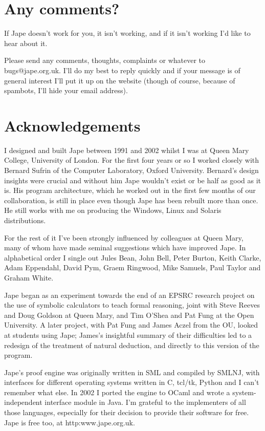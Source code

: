 \documentclass[11pt]{book}
\begin{document}
\section*{Any comments?}

If Jape doesn't work for you, it isn't working, and if it isn't working I'd like to hear about it. 

Please send any comments, thoughts, complaints or whatever to bugs@jape.org.uk. I'll do my best to reply quickly and if your message is of general interest I'll put it up on the website (though of course, because of spambots, I'll hide your email address). 

\section*{Acknowledgements}

I designed and built Jape between 1991 and 2002 whilst I was at Queen Mary College, University of London. For the first four years or so I worked closely with Bernard Sufrin of the Computer Laboratory, Oxford University. Bernard's design insights were crucial and without him Jape wouldn't exist or be half as good as it is. His program architecture, which he worked out in the first few months of our collaboration, is still in place even though Jape has been rebuilt more than once. He still works with me on producing the Windows, Linux and Solaris distributions.

For the rest of it I've been strongly influenced by colleagues at Queen Mary, many of whom have made seminal suggestions which have improved Jape. In alphabetical order I single out Jules Bean, John Bell, Peter Burton, Keith Clarke, Adam Eppendahl, David Pym, Graem Ringwood, Mike Samuels, Paul Taylor and Graham White. 

Jape began as an experiment towards the end of an EPSRC research project on the use of symbolic calculators to teach formal reasoning, joint with Steve Reeves and Doug Goldson at Queen Mary, and Tim O'Shea and Pat Fung at the Open University. A later project, with Pat Fung and James Aczel from the OU, looked at students using Jape; James's insightful summary of their difficulties led to a redesign of the treatment of natural deduction, and directly to this version of the program.

Jape's proof engine was originally written in SML and compiled by SMLNJ, with interfaces for different operating systems written in C, tcl/tk, Python and I can't remember what else. In 2002 I ported the engine to OCaml and wrote a system-independent interface module in Java. I'm grateful to the implementers of all those languages, especially for their decision to provide their software for free. Jape is free too, at http:www.jape.org.uk. 
\end{document}
